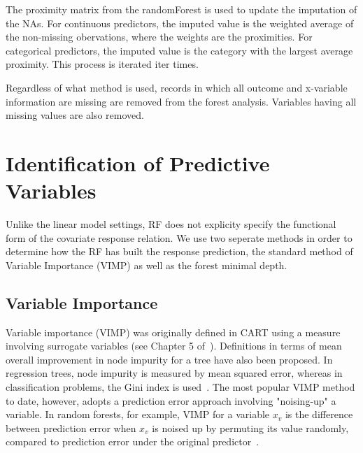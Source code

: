 \documentclass[nojss]{jss}\usepackage[]{graphicx}\usepackage[]{color}
\begin{document}
The proximity matrix from the randomForest is used to update the imputation of the NAs. For continuous predictors, the imputed value is the weighted average of the non-missing obervations, where the weights are the proximities. For categorical predictors, the imputed value is the category with the largest average proximity. This process is iterated iter times.

Regardless of what method is used, records in which all outcome and x-variable information are missing are removed from the forest analysis. Variables having all missing values are also removed.

\section{Identification of Predictive Variables}
Unlike the linear model settings, RF does not explicity specify the functional form of the covariate response relation. We use two seperate methods in order to determine how the RF has built the response prediction, the standard method of Variable Importance (VIMP) as well as the forest minimal depth.


\subsection{Variable Importance}\label{S:vimp}
Variable importance (VIMP) was originally defined in CART using a measure involving surrogate variables (see Chapter 5 of~\cite{cart:1984}). Definitions in terms of mean overall improvement in node impurity for a tree have also been proposed. In regression trees, node impurity is measured by mean squared error, whereas in classification problems, the Gini index is used~\citep{FriedmanGreedyfunction:2000}. The most popular VIMP method to date, however, adopts a prediction error approach involving "noising-up" a variable. In random forests, for example, VIMP for a variable $x_v$ is the difference between prediction error when $x_v$ is noised up by permuting its value randomly, compared to prediction error under the original predictor~\citep{Breiman:2001,liaw:2002,Ishwaran:2007,Ishwaran:2008}.
\end{document}
